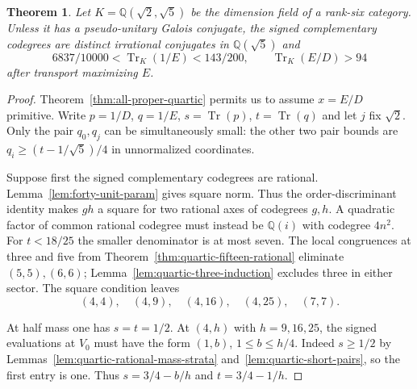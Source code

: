 \documentclass[11pt,reqno]{amsart}
\newtheorem{theorem}{Theorem}[section]
\theoremstyle{remark}\newtheorem{remark}[theorem]{Remark}
\numberwithin{equation}{section}
\begin{document}
\smallskip
\begin{theorem}\label{thm:quartic-silvergold-reduction}
Let $K=\mathbb Q(\sqrt2,\sqrt5)$ be the dimension field of a
rank-six category. Unless it has a pseudo-unitary Galois conjugate,
the signed complementary codegrees are distinct irrational
conjugates in $\mathbb Q(\sqrt5)$ and
\[
 6837/10000< \operatorname{Tr}_K(1/E)<143/200,\qquad
 \operatorname{Tr}_K(E/D)>94
\]
after transport maximizing $E$.
\end{theorem}
\begin{proof}
Theorem~\ref{thm:all-proper-quartic} permits us to assume $x=E/D$
primitive. Write $p=1/D$, $q=1/E$, $s=\operatorname{Tr}(p)$,
$t=\operatorname{Tr}(q)$ and let $j$ fix $\sqrt2$. Only the pair $q_0,q_j$ can be simultaneously small:
the other two pair bounds are $q_i\ge(t-1/\sqrt5)/4$ in
unnormalized coordinates.

Suppose first the signed complementary codegrees are rational.
Lemma~\ref{lem:forty-unit-param} gives square norm. Thus the
order-discriminant identity makes $gh$ a square for two rational axes
of codegrees $g,h$. A quadratic factor of common rational codegree
must instead be $\mathbb Q(i)$ with codegree $4n^2$. For $t<18/25$
the smaller denominator is at most seven. The local congruences at
three and five from Theorem~\ref{thm:quartic-fifteen-rational}
eliminate $(5,5),(6,6)$; Lemma~\ref{lem:quartic-three-induction}
excludes three in either sector.
The square condition leaves
\[
 (4,4),\quad(4,9),\quad(4,16),\quad(4,25),\quad(7,7).
\]

At half mass one has $s=t=1/2$. At $(4,h)$ with $h=9,16,25$,
the signed evaluations at $V_0$ must have the form $(1,b)$,
$1\le b\le h/4$. Indeed $s\ge1/2$ by Lemmas~\ref{lem:quartic-rational-mass-strata}
and~\ref{lem:quartic-short-pairs}, so the first entry is one.
Thus $s=3/4-b/h$ and $t=3/4-1/h$.


\end{proof}
\end{document}
